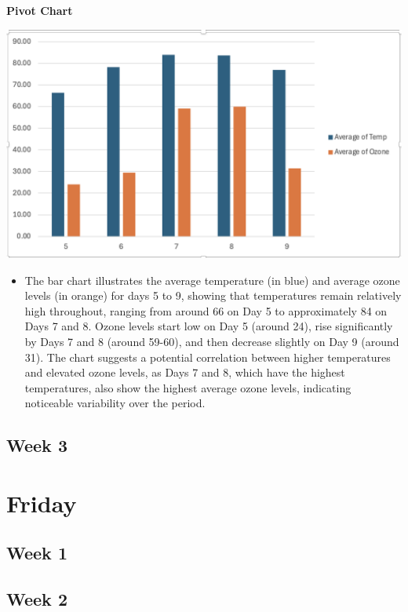 \documentclass[
  letterpaper,
  DIV=11,
  numbers=noendperiod]{scrreprt}
\providecommand{\tightlist}{%
  \setlength{\itemsep}{0pt}\setlength{\parskip}{0pt}}\usepackage{longtable,booktabs,array}
\begin{document}
\textbf{Pivot Chart}

\includegraphics{pivot2_chart_baruga.png}

\begin{itemize}
\tightlist
\item
  The bar chart illustrates the average temperature (in blue) and
  average ozone levels (in orange) for days 5 to 9, showing that
  temperatures remain relatively high throughout, ranging from around 66
  on Day 5 to approximately 84 on Days 7 and 8. Ozone levels start low
  on Day 5 (around 24), rise significantly by Days 7 and 8 (around
  59-60), and then decrease slightly on Day 9 (around 31). The chart
  suggests a potential correlation between higher temperatures and
  elevated ozone levels, as Days 7 and 8, which have the highest
  temperatures, also show the highest average ozone levels, indicating
  noticeable variability over the period.
\end{itemize}

\subsection{Week 3}\label{week-3-5}

\section{Friday}\label{friday-2}

\subsection{Week 1}\label{week-1-7}

\subsection{Week 2}\label{week-2-7}
\end{document}
